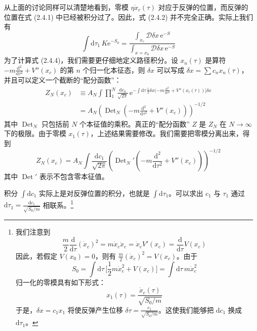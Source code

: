 从上面的讨论同样可以清楚地看到，零模 $\eta\dot{x}_c(\tau)$ 对应于反弹的位置，而反弹的位置在式 (2.4.1) 中已经被积分过了。因此，式 (2.4.2) 并不完全正确。实际上我们有
\begin{equation*}
\int \mathrm{d}\tau_1\, K\mathrm{e}^{-S_0} = \frac{\int_{x_c} \mathcal{D}\delta x\, \mathrm{e}^{-S}}{\int_{x=x_0} \mathcal{D}\delta x\, \mathrm{e}^{-S}}\tag{2.4.4}
\end{equation*}
为了计算式 (2.4.4)，我们需要更仔细地定义路径积分。设 $x_n(\tau)$ 是算符 $-m\frac{\mathrm{d}^2}{\mathrm{d}\tau^2} + V''(x_c)$ 的第 $n$ 个归一化本征态，则 $\delta x$ 可以写成 $\delta x = \sum c_n x_n(\tau)$，并且可以定义一个截断的“配分函数”：
\begin{align*}
Z_N(x_c) &\equiv A_N \int \prod_1^N \frac{\mathrm{d}c_n}{\sqrt{2\pi}}\, \mathrm{e}^{-\int \mathrm{d}\tau\, \frac{1}{2}\delta x(-m\frac{\mathrm{d}^2}{\mathrm{d}\tau^2} + V''(x_c(\tau))]\delta x} \\
&= A_N \left(\operatorname{Det}_N\left(-m\frac{\mathrm{d}^2}{\mathrm{d}\tau^2} + V''(x_c)\right)\right)^{-1/2}
\end{align*}
其中 $\operatorname{Det}_N$ 只包括前 $N$ 个本征值的乘积。真正的“配分函数” $Z$ 是 $Z_N$ 在 $N \to \infty$ 下的极限。由于零模 $x_1(\tau)$，上述结果需要修改。我们需要把零模分离出来，得到
\begin{equation*}
Z_N(x_c) = A_N \int \frac{\mathrm{d}c_1}{\sqrt{2\pi}} \left(\operatorname{Det}_N'\left(-m\frac{\mathrm{d}^2}{\mathrm{d}\tau^2} + V''(x_c)\right)\right)^{-1/2}
\end{equation*}
其中 $\operatorname{Det}'$ 表示不包含零本征值。

积分 $\int \mathrm{d}c_1$ 实际上是对反弹位置的积分，也就是 $\int \mathrm{d}\tau_1$。可以求出 $c_1$ 与 $\tau_1$ 通过 $\mathrm{d}\tau_1 = \frac{\mathrm{d}c_1}{\sqrt{S_0/m}}$ 相联系。\footnote{我们注意到
\begin{equation*}
\frac{m}{2}\frac{\mathrm{d}}{\mathrm{d}\tau}(\dot{x}_c)^2 = m\dot{x}_c\ddot{x}_c = \dot{x}_c V'(x_c) = \frac{\mathrm{d}}{\mathrm{d}\tau}V(x_c)
\end{equation*}
因此，若假定 $V(x_0) = 0$，则有 $\frac{m}{2}(\dot{x}_c)^2 = V(x_c)$。由于
\begin{equation*}
S_0 = \int \mathrm{d}\tau\, \Big[\frac{1}{2}m\dot{x}_c^2 + V(x_c)\Big] = \int \mathrm{d}\tau\, m\dot{x}_c^2
\end{equation*}
归一化的零模具有如下形式：
\begin{equation*}
x_1(\tau) = \frac{\dot{x}_c(\tau)}{\sqrt{S_0/m}}
\end{equation*}
于是，$\delta x = c_1 x_1$ 将使反弹产生位移 $\delta\tau = \frac{c_1}{\sqrt{S_0/m}}$。这使我们能够把 $\mathrm{d}c_1$ 换成 $\mathrm{d}\tau_1$。}

